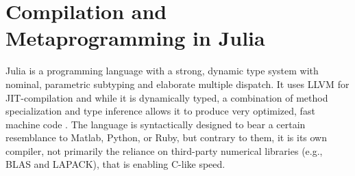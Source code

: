 \section{Compilation and Metaprogramming in Julia}
\label{sec:comp-metapr-julia}

Julia \parencite{bezanson2017julia} is a programming language with a strong, dynamic type system
with nominal, parametric subtyping and elaborate multiple dispatch.  It uses LLVM
\parencite{llvmproject2019llvm} for JIT-compilation and while it is dynamically typed, a combination
of method specialization and type inference allows it to produce very optimized, fast machine code
\parencite{bezanson2018julia}.  The language is syntactically designed to bear a certain resemblance
to Matlab, Python, or Ruby, but contrary to them, it is its own compiler, not primarily the reliance
on third-party numerical libraries (e.g., BLAS and LAPACK), that is enabling C-like speed.

